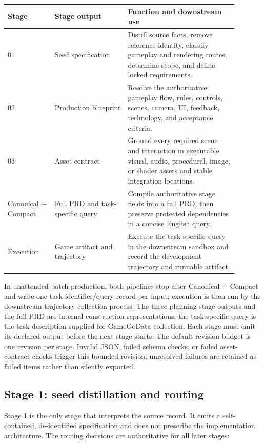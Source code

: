 \documentclass{article}
\begin{document}
\begin{center}
\small
\begin{tabular}{p{0.18\linewidth}p{0.29\linewidth}p{0.42\linewidth}}
\toprule
Stage & Stage output & Function and downstream use \\
\midrule
01 & Seed specification & Distill source facts, remove reference identity, classify gameplay and rendering routes, determine scope, and define locked requirements. \\
02 & Production blueprint & Resolve the authoritative gameplay flow, rules, controls, scenes, camera, UI, feedback, technology, and acceptance criteria. \\
03 & Asset contract & Ground every required scene and interaction in executable visual, audio, procedural, image, or shader assets and stable integration locations. \\
Canonical + Compact & Full PRD and task-specific query & Compile authoritative stage fields into a full PRD, then preserve protected dependencies in a concise English query. \\
Execution & Game artifact and trajectory & Execute the task-specific query in the downstream sandbox and record the development trajectory and runnable artifact. \\
\bottomrule
\end{tabular}
\end{center}

In unattended batch production, both pipelines stop after Canonical + Compact and write one task-identifier/query record per input; execution is then run by the downstream trajectory-collection process. The three planning-stage outputs and the full PRD are internal construction representations; the task-specific query is the task description supplied for GameGoData collection. Each stage must emit its declared output before the next stage starts. The default revision budget is one revision per stage. Invalid JSON, failed schema checks, or failed asset-contract checks trigger this bounded revision; unresolved failures are retained as failed items rather than silently exported.

\subsection{Stage 1: seed distillation and routing}
\label{app:stage1_routing}

Stage 1 is the only stage that interprets the source record. It emits a self-contained, de-identified specification and does not prescribe the implementation architecture. The routing decisions are authoritative for all later stages:
\end{document}
